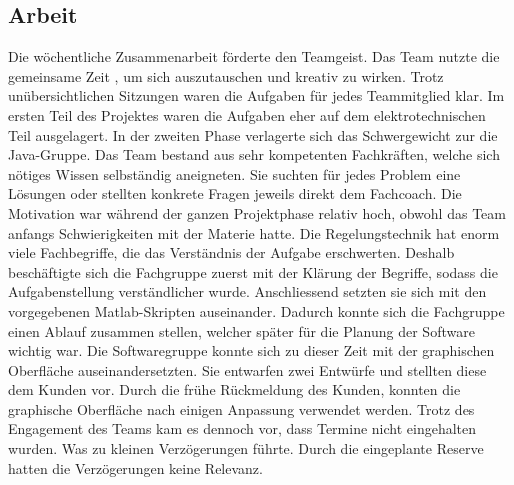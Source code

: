 \subsection{Arbeit}
Die wöchentliche Zusammenarbeit förderte den Teamgeist. Das Team nutzte die gemeinsame Zeit , um sich auszutauschen und kreativ zu wirken. Trotz unübersichtlichen Sitzungen waren die Aufgaben für jedes Teammitglied klar. Im ersten Teil des Projektes waren die Aufgaben eher auf dem elektrotechnischen Teil ausgelagert. In der zweiten Phase verlagerte sich das Schwergewicht zur die Java-Gruppe. Das Team bestand aus sehr kompetenten Fachkräften, welche sich nötiges Wissen selbständig aneigneten. Sie suchten für jedes Problem eine Lösungen oder stellten konkrete Fragen jeweils direkt dem Fachcoach. Die Motivation war während der ganzen Projektphase relativ hoch, obwohl das Team anfangs Schwierigkeiten mit der Materie hatte. 
Die Regelungstechnik hat enorm viele Fachbegriffe, die das Verständnis der Aufgabe erschwerten. Deshalb beschäftigte sich die Fachgruppe zuerst mit der Klärung der Begriffe, sodass die Aufgabenstellung verständlicher wurde. Anschliessend setzten sie sich mit den vorgegebenen Matlab-Skripten auseinander. Dadurch konnte sich die Fachgruppe einen Ablauf zusammen stellen, welcher später für die Planung der Software wichtig war. Die Softwaregruppe konnte sich zu dieser Zeit mit der graphischen Oberfläche auseinandersetzten. Sie entwarfen zwei Entwürfe und stellten diese dem Kunden vor. Durch die frühe Rückmeldung des Kunden, konnten die graphische Oberfläche nach einigen Anpassung  verwendet werden.
Trotz des Engagement des Teams kam es dennoch vor, dass Termine nicht eingehalten wurden. Was zu kleinen Verzögerungen führte. Durch die eingeplante Reserve hatten die Verzögerungen keine Relevanz. 

 
